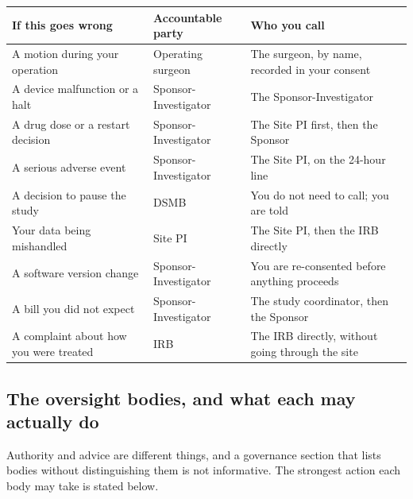 \noindent\begin{tabularx}{\textwidth}{L{4.6cm} L{3.7cm} Y}
\toprule
\textbf{If this goes wrong} & \textbf{Accountable party} & \textbf{Who you call} \\
\midrule
A motion during your operation & Operating surgeon & The surgeon, by name, recorded in your consent \\
A device malfunction or a halt & Sponsor-Investigator & The Sponsor-Investigator \\
A drug dose or a restart decision & Sponsor-Investigator & The Site PI first, then the Sponsor \\
A serious adverse event & Sponsor-Investigator & The Site PI, on the 24-hour line \\
A decision to pause the study & DSMB & You do not need to call; you are told \\
Your data being mishandled & Site PI & The Site PI, then the IRB directly \\
A software version change & Sponsor-Investigator & You are re-consented before anything proceeds \\
A bill you did not expect & Sponsor-Investigator & The study coordinator, then the Sponsor \\
A complaint about how you were treated & IRB & The IRB directly, without going through the site \\
\bottomrule
\end{tabularx}

\vspace{0.30em}

\subsection{The oversight bodies, and what each may actually do}

Authority and advice are different things, and a governance section that lists
bodies without distinguishing them is not informative. The strongest action each
body may take is stated below.

\vspace{0.30em}


